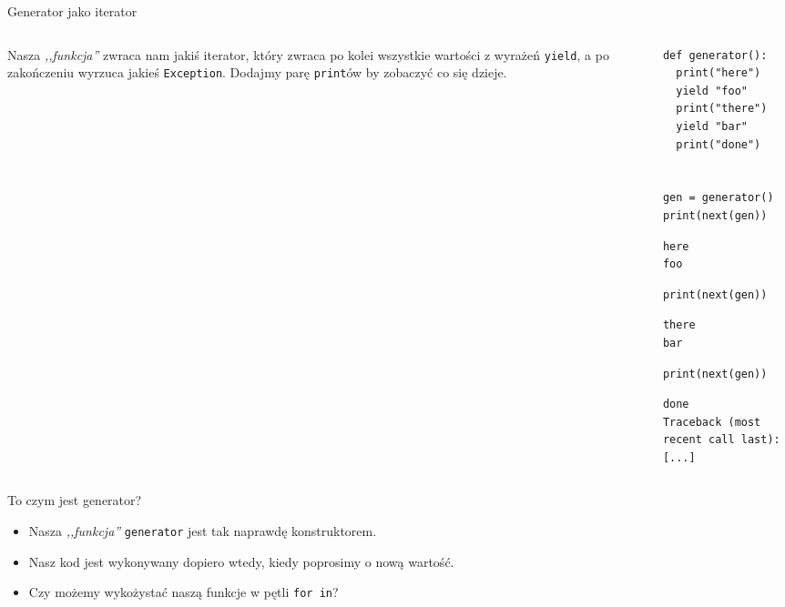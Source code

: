 \documentclass[aspectratio=169]{beamer}
\begin{document}
\begin{frame}[fragile]{Generator jako iterator}
  \begin{columns}
    \begin{column}{0.5\textwidth}
      Nasza \emph{,,funkcja''} zwraca nam jakiś iterator, który zwraca po kolei 
      wszystkie wartości z wyrażeń \texttt{yield}, a po zakończeniu
      wyrzuca jakieś \texttt{Exception}. Dodajmy parę
      \texttt{print}ów by zobaczyć co się dzieje.
    \end{column}
    \begin{column}{0.3\textwidth}
      \scriptsize
      \begin{verbatim}
def generator():
  print("here")
  yield "foo"
  print("there")
  yield "bar"
  print("done")


gen = generator()
print(next(gen))
      \end{verbatim}
      
      \begin{verbatim}
here
foo
      \end{verbatim}
      
      \begin{verbatim}
print(next(gen))
      \end{verbatim}
      \begin{verbatim}
there
bar
      \end{verbatim}
      \begin{verbatim}
print(next(gen))
      \end{verbatim}
      \begin{verbatim}
done
Traceback (most recent call last):
[...]
      \end{verbatim}
    \end{column}
  \end{columns}
\end{frame}

\begin{frame}{To czym jest generator?}
  \begin{itemize}
    \item Nasza \emph{,,funkcja''} \texttt{generator} jest tak naprawdę
      konstruktorem.
    \pause
    \item Nasz kod jest wykonywany dopiero wtedy, kiedy poprosimy o nową
      wartość.
    \pause
    \item Czy możemy wykożystać naszą funkcje w pętli \texttt{for in}?
  \end{itemize}
\end{frame}
\end{document}
